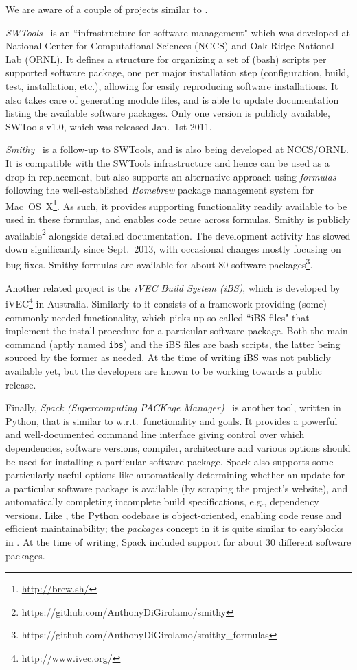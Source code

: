 We are aware of a couple of projects similar to \easybuild{}.

\emph{SWTools}~\cite{swtools, jones08} is an ``infrastructure for software
management" which was developed at National Center for Computational Sciences (NCCS)
and Oak Ridge National Lab (ORNL). It defines a structure for organizing a set of
(bash) scripts per supported software package, one per major installation step
(configuration, build, test, installation, etc.), allowing for easily reproducing 
software installations. It also takes care of generating module files, and is
able to update documentation listing the available software packages.
Only one version is publicly available, SWTools v1.0, which was released Jan.~1st 2011.

\emph{Smithy}~\cite{smithy} is a follow-up to SWTools, and is also being developed
at NCCS/ORNL. It is compatible with the SWTools infrastructure and hence can be
used as a drop-in replacement, but also supports an alternative approach using
\emph{formulas} following the well-established \emph{Homebrew} package management 
system for Mac~OS~X\footnote{\url{http://brew.sh/}}. As such, it provides
supporting functionality readily available to be used in these formulas, and enables
code reuse across formulas. Smithy is publicly
available\footnote{https://github.com/AnthonyDiGirolamo/smithy} alongside detailed
documentation. The development activity has slowed down significantly since
Sept.~2013, with occasional changes mostly focusing on bug fixes.
Smithy formulas are available for about 80 software
packages\footnote{https://github.com/AnthonyDiGirolamo/smithy\_formulas}.

Another related project is the \emph{iVEC Build System (iBS)}, which is developed 
by iVEC\footnote{http://www.ivec.org/} in Australia. Similarly to \easybuild{}
it consists of a framework providing (some) commonly needed functionality, which
picks up so-called ``iBS files" that implement the install procedure for a 
particular software package. Both the main command (aptly named
\texttt{\small ibs}) and the iBS files are bash scripts, the latter being sourced by
the former as needed. At the time of writing iBS was not publicly available yet, but
the developers are known to be working towards a public release.

Finally, \emph{Spack (Supercomputing PACKage Manager)}~\cite{spack} is another
tool, written in Python, that is similar to \easybuild{} w.r.t.\ functionality and
goals. It provides a powerful and well-documented command line interface giving
control over which dependencies, software versions, compiler, architecture and
various options should be used for installing a particular software package.
Spack also supports some particularly useful options like automatically determining
whether an update for a particular software package is available
(by scraping the project's website), and automatically completing
incomplete build specifications, e.g., dependency versions. Like
\easybuild{}, the Python codebase is object-oriented, enabling code reuse and
efficient maintainability; the \emph{packages} concept in it is quite similar to
easyblocks in \easybuild{}. At the time of writing, Spack included support for about
30 different software packages.

